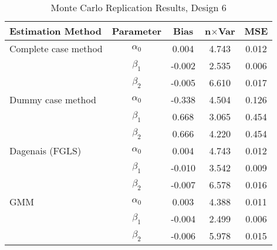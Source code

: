 \begin{table}
\centering
\caption{Monte Carlo Replication Results, Design 6}
\label{table:MCReplicationResultsDesign6}
\begin{tabular}{lcccc}
\toprule
Estimation Method & Parameter & Bias & n$\times$Var & MSE \\
\midrule
Complete case method & $\alpha_0$ & 0.004 & 4.743 & 0.012 \\
 & $\beta_1$ & -0.002 & 2.535 & 0.006 \\
 & $\beta_2$ & -0.005 & 6.610 & 0.017 \\
Dummy case method & $\alpha_0$ & -0.338 & 4.504 & 0.126 \\
 & $\beta_1$ & 0.668 & 3.065 & 0.454 \\
 & $\beta_2$ & 0.666 & 4.220 & 0.454 \\
Dagenais (FGLS) & $\alpha_0$ & 0.004 & 4.743 & 0.012 \\
 & $\beta_1$ & -0.010 & 3.542 & 0.009 \\
 & $\beta_2$ & -0.007 & 6.578 & 0.016 \\
GMM & $\alpha_0$ & 0.003 & 4.388 & 0.011 \\
 & $\beta_1$ & -0.004 & 2.499 & 0.006 \\
 & $\beta_2$ & -0.006 & 5.978 & 0.015 \\
\bottomrule
\end{tabular}
\end{table}

